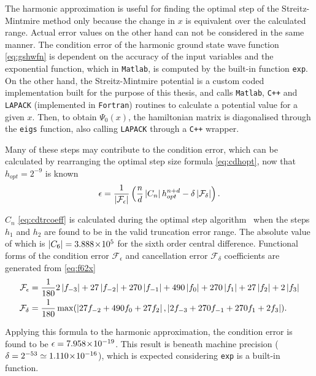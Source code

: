 The harmonic approximation is useful for finding the optimal step of the Streitz-Mintmire method only because the change in $x$ is equivalent over the calculated range.
Actual error values on the other hand can not be considered in the same manner.
The condition error of the harmonic ground state wave function \cref{eq:gshwfn} is dependent on the accuracy of the input variables and the exponential function, which in \texttt{Matlab}, is computed by the built-in function \texttt{exp}.
On the other hand, the Streitz-Mintmire potential is a custom coded implementation built for the purpose of this thesis, and calls \texttt{Matlab}, \texttt{C++} and \texttt{LAPACK} (implemented in \texttt{Fortran}) routines to calculate a potential value for a given $x$.
Then, to obtain $\Psi_0(x)$, the hamiltonian matrix is diagonalised through the \texttt{eigs} function, also calling \texttt{LAPACK} through a \texttt{C++} wrapper.

Many of these steps may contribute to the condition error, which can be calculated by rearranging the optimal step size formula \cref{eq:cdhopt}, now that $h_{opt} = 2^{-9}$ is known
\begin{equation}
\epsilon = \frac{1}{\left\lvert \mathcal{F}_\epsilon\right\rvert}\left(\frac{n}{d}\left\lvert C_n\right\rvert h_{opt}^{n+d}-\delta\left\lvert \mathcal{F}_\delta\right\rvert\right).
\end{equation}

$C_n$ \cref{eq:cdtrcoeff} is calculated during the optimal step algorithm~\cite{Mathur2012} when the steps $h_1$ and $h_2$ are found to be in the valid truncation error range.
The absolute value of which is $\left\lvert C_6\right\rvert = 3.888\!\times\!10^{5}$ for the sixth order central difference.
Functional forms of the condition error $\mathcal{F}_\epsilon$ and cancellation error $\mathcal{F}_\delta$ coefficients are generated from \cref{eq:f62x}
{\mathindent=0.4cm
\begin{align}
\mathcal{F}_\epsilon &= \frac{1}{180}2\left\lvert f_{-3}\right\rvert + 27\left\lvert f_{-2}\right\rvert + 270\left\lvert f_{-1}\right\rvert + 490\left\lvert f_{0}\right\rvert + 270\left\lvert f_{1}\right\rvert + 27\left\lvert f_{2}\right\rvert + 2\left\lvert f_{3}\right\rvert \\
\mathcal{F}_\delta &= \frac{1}{180}\max(\left\lvert 27f_{-2} + 490f_{0} + 27f_{2}\right\rvert,\left\lvert 2f_{-3} + 270f_{-1} + 270f_{1} + 2f_{3}\right\rvert).
\end{align}
}

Applying this formula to the harmonic approximation, the condition error is found to be $\epsilon = 7.958\!\times\!10^{-19}$.
This result is beneath machine precision ($\delta = 2^{-53} \simeq 1.110\!\times\!10^{-16}$), which is expected considering \texttt{exp} is a built-in function.

